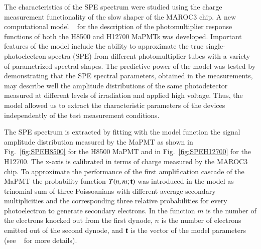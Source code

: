 \documentclass[5p,times,twocolumn]{elsarticle}
\begin{document}
The characteristics of the SPE spectrum were studied using the charge measurement functionality of the slow shaper of the MAROC3 chip.
A new computational model ~\cite{Pavel} for the description of the photomultiplier response functions of both the H8500 and H12700 MaPMTs was developed. Important features of the model include the ability to approximate the true single-photoelectron spectra (SPE) from different photomultiplier tubes with a variety of parametrized spectral shapes.
The predictive power of the model was tested by demonstrating that the SPE spectral parameters, obtained in the measurements, may describe well the amplitude distributions of the same photodetector measured at different levels of irradiation and applied high voltage. Thus, the model allowed us to extract the characteristic parameters of the devices independently of the test measurement conditions.


The SPE spectrum is extracted by fitting with the model function the signal amplitude distribution measured by the MaPMT as shown in 
Fig.~\ref{fig:SPEH8500} for the H8500 MaPMT and in Fig.~\ref{fig:SPEH12700} for the H12700. The x-axis is calibrated in terms of charge measured by the MAROC3 chip.
To approximate the performance of the first amplification cascade of the MaPMT the probability function $T(n,m;\bf{t})$ was introduced in the model as trinomial sum of three Poissoanians with different average secondary multiplicities and the corresponding three relative probabilities for every photoelectron to generate secondary electrons. In the function $m$ is the number of the electrons knocked out from the first dynode, $n$ is the number of electrons emitted out of the second dynode, and $\bf{t}$ is the vector of the model parameters (see ~\cite{Pavel} for more details).
 
\end{document}

